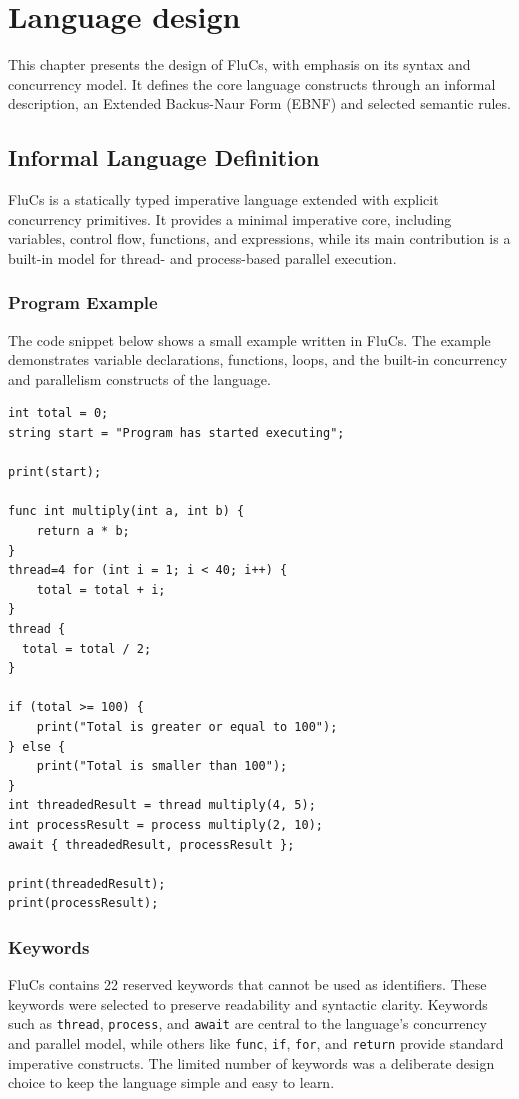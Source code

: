 \chapter{Language design}
\label{ch:languagedesign}
This chapter presents the design of FluCs, with emphasis on its syntax and concurrency model. It defines the core language constructs through an informal description, an Extended Backus-Naur Form (EBNF) and selected semantic rules.
\section{Informal Language Definition}
FluCs is a statically typed imperative language extended with explicit concurrency primitives. It provides a minimal imperative core, including variables, control flow, functions, and expressions, while its main contribution is a built-in model for thread- and process-based parallel execution.
\subsection{Program Example}
The code snippet below shows a small example written in FluCs. The example demonstrates variable declarations, functions, loops, and the built-in concurrency and parallelism constructs of the language.
\begin{lstlisting}
int total = 0;
string start = "Program has started executing";

print(start);

func int multiply(int a, int b) {
    return a * b;
}
thread=4 for (int i = 1; i < 40; i++) {
    total = total + i;
}
thread {
  total = total / 2;
}

if (total >= 100) {
    print("Total is greater or equal to 100");
} else {
    print("Total is smaller than 100");
}
int threadedResult = thread multiply(4, 5);
int processResult = process multiply(2, 10);
await { threadedResult, processResult };

print(threadedResult);
print(processResult);
\end{lstlisting}
\subsection{Keywords}
FluCs contains 22 reserved keywords that cannot be used as identifiers. These keywords were selected to preserve readability and syntactic clarity. Keywords such as \texttt{thread}, \texttt{process}, and \texttt{await} are central to the language's concurrency and parallel model, while others like \texttt{func}, \texttt{if}, \texttt{for}, and \texttt{return} provide standard imperative constructs. The limited number of keywords was a deliberate design choice to keep the language simple and easy to learn.
